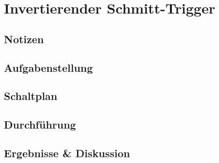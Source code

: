 \documentclass[12pt,a4paper,titlepage]{article}
\begin{document}
\section{Invertierender Schmitt-Trigger}

\subsection*{Notizen}


\subsection*{Aufgabenstellung}

\subsection*{Schaltplan}

\subsection*{Durchf\"uhrung}

\subsection*{Ergebnisse \& Diskussion}
\end{document}
